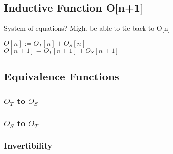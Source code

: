 \documentclass[11pt]{article}
\begin{document}













\subsection{Inductive Function O[n+1]}
System of equations? Might be able to tie back to O[n]
\begin{center}
\vspace{2mm}
$
O[n] := O_T[n] + O_S[n]
$
\\ \vspace{2mm}
$
O[n+1] = O_T[n+1] + O_S[n+1]
$
\end{center}











\subsection{Equivalence Functions}
\subsubsection{$O_T$ to $O_S$}
\subsubsection{$O_S$ to $O_T$}
\subsubsection{Invertibility}
\end{document}
